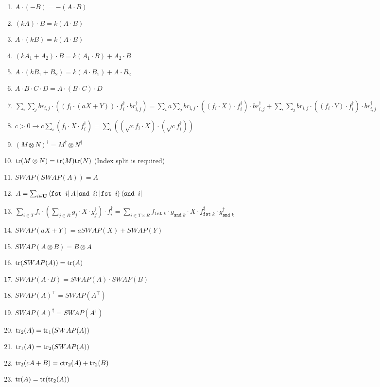 \documentclass[manuscript, review, timestamp]{acmart}
\newcommand*{\fst}{\texttt{fst }}
\newcommand*{\snd}{\texttt{snd }}
\begin{document}
\begin{enumerate}
  \item \pass $A \cdot (-B) = - (A \cdot B)$
  \item \pass $(k A) \cdot B = k (A \cdot B)$
  \item \pass $A \cdot (k B) = k (A \cdot B)$
  \item \pass $(k A_1 + A_2) \cdot B = k (A_1 \cdot B) + A_2 \cdot B$
  \item \pass $A \cdot (k B_1 + B_2) = k (A \cdot B_1) + A \cdot B_2$
  \item \pass $A \cdot B \cdot C \cdot D = A \cdot (B \cdot C) \cdot D$
  \item \pass $\sum_i \sum_j br_{i, j} \cdot ((f_i \cdot (a X + Y)) \cdot f_i^\dagger \cdot br_{i, j}^\dagger) = \sum_i a \sum_j br_{i, j} \cdot ((f_i \cdot X) \cdot f_i^\dagger) \cdot br_{i, j}^\dagger + \sum_i \sum_j br_{i, j} \cdot ((f_i \cdot Y) \cdot f_i^\dagger) \cdot br_{i, j}^\dagger$
  \item \pass $c > 0 \to c \sum_i (f_i \cdot X \cdot f_i^\dagger) = \sum_i ((\sqrt{c} f_i \cdot X) \cdot (\sqrt{c} f_i^\dagger))$
  \item \pass $(M \otimes N)^\dagger = M^\dagger \otimes N^\dagger$
  \item \pass $\mathrm{tr} (M \otimes N) = \mathrm{tr}(M) \mathrm{tr}(N)$ (Index split is required)
  \item \pass $SWAP(SWAP(A))=A$
  \item \pass $A = \sum_{i \in \mathbf{U}} \bra{\fst i} A \ket{\snd i} \ket{\fst i} \bra{\snd i}$
  \item \pass $\sum_{i\in T} f_i \cdot (\sum_{j \in R} g_j \cdot X \cdot g_j^\dagger) \cdot f_i^\dagger = \sum_{i \in T\times R} f_{\fst k} \cdot g_{\snd k} \cdot X \cdot f_{\fst k}^\dagger \cdot g_{\snd k}^\dagger$
  \item \pass $SWAP(a X + Y) = a SWAP(X) + SWAP(Y)$
  \item \pass $SWAP(A\otimes B) = B \otimes A$
  \item \pass $\mathrm{tr}(SWAP(A)) = \mathrm{tr}(A)$
  \item \pass $SWAP(A \cdot B) = SWAP(A) \cdot SWAP(B)$
  \item \pass $SWAP(A)^\top = SWAP(A^\top)$
  \item \pass $SWAP(A)^\dagger = SWAP(A^\dagger)$
  \item \pass $\mathrm{tr}_2(A) = \mathrm{tr}_1(SWAP(A))$
  \item \pass $\mathrm{tr}_1(A) = \mathrm{tr}_2(SWAP(A))$
  \item \pass $\mathrm{tr}_2(c A + B) = c \mathrm{tr}_2(A) + \mathrm{tr}_2(B)$
  \item \pass $\mathrm{tr}(A) = \mathrm{tr}(\mathrm{tr}_2(A))$

\end{enumerate}
\end{document}

